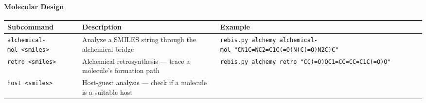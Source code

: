 \hypertarget{molecular-design}{%
\paragraph{Molecular Design}\label{molecular-design}}

\begin{longtable}[]{@{}lll@{}}
\toprule
\begin{minipage}[b]{0.32\columnwidth}\raggedright
Subcommand\strut
\end{minipage} & \begin{minipage}[b]{0.35\columnwidth}\raggedright
Description\strut
\end{minipage} & \begin{minipage}[b]{0.24\columnwidth}\raggedright
Example\strut
\end{minipage}\tabularnewline
\midrule
\endhead
\begin{minipage}[t]{0.32\columnwidth}\raggedright
\texttt{alchemical-mol\ \textless{}smiles\textgreater{}}\strut
\end{minipage} & \begin{minipage}[t]{0.35\columnwidth}\raggedright
Analyze a SMILES string through the alchemical bridge\strut
\end{minipage} & \begin{minipage}[t]{0.24\columnwidth}\raggedright
\texttt{rebis.py\ alchemy\ alchemical-mol\ "CN1C=NC2=C1C(=O)N(C(=O)N2C)C"}\strut
\end{minipage}\tabularnewline
\begin{minipage}[t]{0.32\columnwidth}\raggedright
\texttt{retro\ \textless{}smiles\textgreater{}}\strut
\end{minipage} & \begin{minipage}[t]{0.35\columnwidth}\raggedright
Alchemical retrosynthesis --- trace a molecule's formation path\strut
\end{minipage} & \begin{minipage}[t]{0.24\columnwidth}\raggedright
\texttt{rebis.py\ alchemy\ retro\ "CC(=O)OC1=CC=CC=C1C(=O)O"}\strut
\end{minipage}\tabularnewline
\begin{minipage}[t]{0.32\columnwidth}\raggedright
\texttt{host\ \textless{}smiles\textgreater{}}\strut
\end{minipage} & \begin{minipage}[t]{0.35\columnwidth}\raggedright
Host-guest analysis --- check if a molecule is a suitable host\strut
\end{minipage} & \begin{minipage}[t]{0.24\columnwidth}\raggedright

\end{minipage}
\end{longtable}

